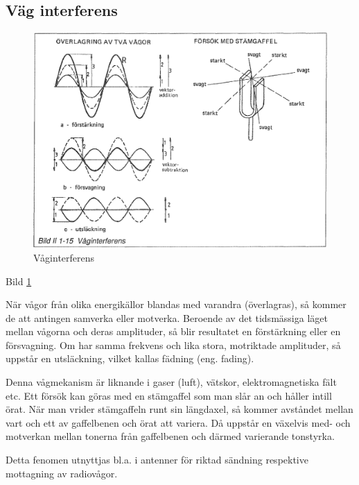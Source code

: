 \subsection{Väg interferens}

\begin{figure}[h]
\begin{center}
\includegraphics[width=14cm]{images/bild_2_1-15}
\caption{Våginterferens}
\label{fig:BildII1-15}
\end{center}
\end{figure}

Bild \ref{fig:BildII1-15}

När vågor från olika energikällor blandas med varandra (överlagras), så kommer
de att antingen samverka eller motverka. Beroende av det tidsmässiga läget
mellan vågorna och deras amplituder, så blir resultatet en förstärkning eller
en försvagning. Om har samma frekvens och lika stora, motriktade amplituder, så
uppstår en utsläckning, vilket kallas fädning (eng. fading).

Denna vågmekanism är liknande i gaser (luft), vätskor, elektromagnetiska fält
etc. Ett försök kan göras med en stämgaffel som man slår an och håller intill
örat. När man vrider stämgaffeln runt sin längdaxel, så kommer avståndet mellan
vart och ett av gaffelbenen och örat att variera. Då uppstår en växelvis med-
och motverkan mellan tonerna från gaffelbenen och därmed varierande tonstyrka.

Detta fenomen utnyttjas bl.a. i antenner för riktad sändning respektive
mottagning av radiovågor.

